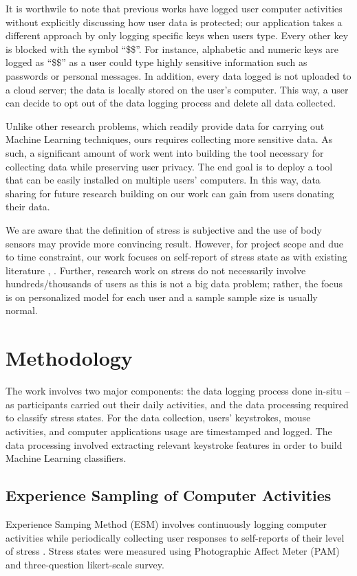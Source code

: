 \documentclass{article}
\begin{document}
It is worthwile to note that previous works have logged user computer activities without explicitly discussing how user data is protected; our application takes a different approach by only logging specific keys when users type. Every other key is blocked with the symbol ``\$\$''. For instance, alphabetic and numeric keys are logged as ``\$\$'' as a user could type highly sensitive information such as passwords or personal messages. In addition, every data logged is not uploaded to a cloud server; the data is locally stored on the user's computer. This way, a user can decide to opt out of the data logging process and delete all data collected.

Unlike other research problems, which readily provide data for carrying out Machine Learning techniques, ours requires collecting more sensitive data. As such, a significant amount of work went into building the tool necessary for collecting data while preserving user privacy. The end goal is to deploy a tool that can be easily installed on multiple users' computers. In this way, data sharing for future research building on our work can gain from users donating their data. 

We are aware that the definition of stress is subjective and the use of body sensors may provide more convincing result. However, for project scope and due to time constraint, our work focuses on self-report of stress state as with  existing literature \cite{epp2011identifying}, \cite{wang2014studentlife}. Further, research work on stress do not necessarily involve hundreds/thousands of users as this is not a big data problem; rather, the focus is on personalized model for each user and a sample sample size is usually normal.
\section{Methodology}
The work involves two major components: the data logging process done in-situ -- as participants carried out their daily activities, and the data processing required to classify stress states. For the data collection, users' keystrokes, mouse activities, and computer applications usage are timestamped and logged. The data processing involved extracting relevant keystroke features in order to build Machine Learning classifiers. 

\subsection{Experience Sampling of Computer Activities}
Experience Samping Method (ESM) involves continuously logging computer activities while periodically collecting user responses to self-reports of their level of stress \cite{hektner2007experience}. Stress states were measured using Photographic Affect Meter (PAM) \cite{pollak2011pam}and three-question likert-scale survey. 
\end{document}
